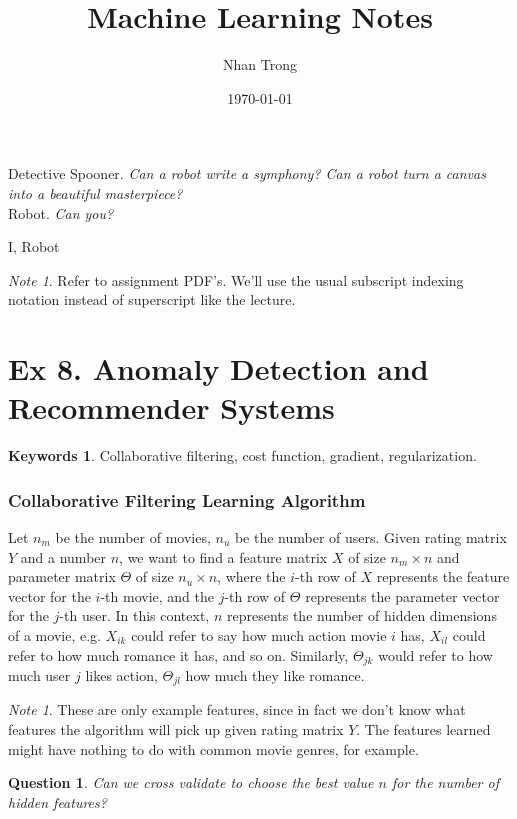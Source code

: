 \documentclass[12pt]{article}
\title{Machine Learning Notes}
\author{Nhan Trong}
\date{\today}                                           %
\theoremstyle{plain}
\newtheorem{question}[theorem]{Question}
\theoremstyle{definition}
\newtheorem*{keywords}{Keywords}
\theoremstyle{remark}
\newtheorem{note}[theorem]{Note}
\begin{document}
\maketitle

\epigraph{Detective Spooner. \textit{Can a robot write a symphony? Can a robot turn a canvas into a beautiful masterpiece?} \\ Robot. \textit{Can you?}}{I, Robot}

\begin{note}
Refer to assignment PDF's. We'll use the usual subscript indexing notation instead of superscript like the lecture.
\end{note}

\part{Ex 8. Anomaly Detection and Recommender Systems}

\begin{keywords}
Collaborative filtering, cost function, gradient, regularization.
\end{keywords}

\section{Collaborative Filtering Learning Algorithm}

Let $n_m$ be the number of movies, $n_u$ be the number of users. Given rating matrix $Y$ and a number $n$, we want to find a feature matrix $X$ of size $n_m \times n$ and parameter matrix $\Theta$ of size $n_u \times n$, where the $i$-th row of $X$ represents the feature vector for the $i$-th movie, and the $j$-th row of $\Theta$ represents the parameter vector for the $j$-th user. In this context, $n$ represents the number of hidden dimensions of a movie, e.g. $X_{ik}$ could refer to say how much action movie $i$ has, $X_{il}$ could refer to how much romance it has, and so on. Similarly, $\Theta_{jk}$ would refer to how much user $j$ likes action, $\Theta_{jl}$ how much they like romance.

\begin{note}
These are only example features, since in fact we don't know what features the algorithm will pick up given rating matrix $Y$. The features learned might have nothing to do with common movie genres, for example.
\end{note}

\begin{question}
Can we cross validate to choose the best value $n$ for the number of hidden features?
\end{question}
\end{document}
